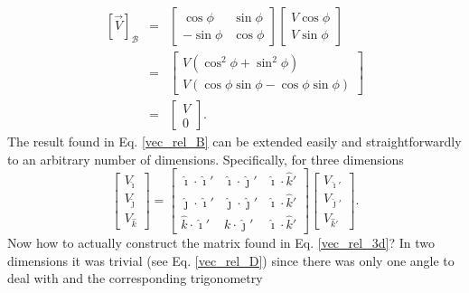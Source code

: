 \documentclass[10pt]{article}
\begin{document}
\begin{eqnarray}
      \left[ \vec V \right]_{\mathcal B}
& = & \left[ \begin{array}{cc} \cos \phi & \sin \phi \\ -\sin \phi & \cos \phi \end{array} \right]
  \left[ \begin{array}{c} V \cos \phi \\ V \sin \phi \end{array} \right] \\
& = & \left[ \begin{array}{c} V \left( \cos^2 \phi + \sin^2 \phi \right) \\
                              V \left( \cos \phi \sin \phi - \cos \phi \sin \phi \right) 
             \end{array} \right] \\
& = & \left[ \begin{array}{c} V \\ 0 \end{array} \right] .
\end{eqnarray}
The result found in Eq. \ref{vec_rel_B} can be extended easily and straightforwardly 
to an arbitrary number of dimensions.  Specifically, for three dimensions 
\begin{equation}\label{vec_rel_3d}
 \left[ \begin{array}{c} V_{\hat \imath} \\ V_{\hat \jmath} \\ V_{\hat k} \end{array} \right]
 = \left[
      \begin{array}{ccc}
         \hat \imath \cdot \hat \imath' & \hat \imath \cdot \hat \jmath' & \hat \imath \cdot \hat k' \\
         \hat \jmath \cdot \hat \imath' & \hat \jmath \cdot \hat \jmath' & \hat \imath \cdot \hat k' \\
         \hat      k \cdot \hat \imath' &           k \cdot \hat \jmath' & \hat \imath \cdot \hat k'
	  \end{array}
	\right]
\left[ \begin{array}{c} V_{\hat \imath'} \\ V_{\hat \jmath'} \\ V_{\hat k'} \end{array} \right].
\end{equation}
Now how to actually construct the matrix found in Eq. \ref{vec_rel_3d}?  In two dimensions it was trivial
(see Eq. \ref{vec_rel_D}) since there was only one angle to deal with and the corresponding trigonometry
\end{document}
